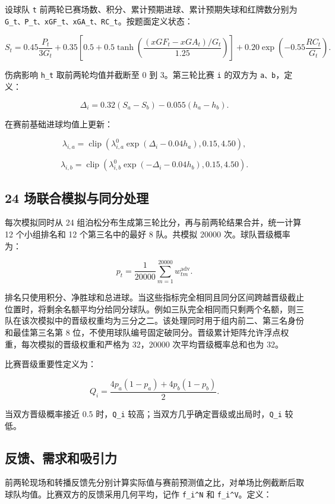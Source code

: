设球队 \texttt{t} 前两轮已赛场数、积分、累计预期进球、累计预期失球和红牌数分别为 \texttt{G\_t、P\_t、xGF\_t、xGA\_t、RC\_t}。按题面定义状态：

\[
S_t=0.45\frac{P_t}{3G_t}
+0.35\left[0.5+0.5\tanh\left(
\frac{(xGF_t-xGA_t)/G_t}{1.25}
\right)\right]
+0.20\exp\left(-0.55\frac{RC_t}{G_t}\right).
\]

伤病影响 \texttt{h\_t} 取前两轮均值并截断至 0 到 3。第三轮比赛 \texttt{i} 的双方为 \texttt{a、b}，定义：

\[
\Delta_i=0.32(S_a-S_b)-0.055(h_a-h_b).
\]

在赛前基础进球均值上更新：

\[
\lambda_{i,a}=\operatorname{clip}\left(
\lambda_{i,a}^0\exp(\Delta_i-0.04h_a),0.15,4.50
\right),
\]

\[
\lambda_{i,b}=\operatorname{clip}\left(
\lambda_{i,b}^0\exp(-\Delta_i-0.04h_b),0.15,4.50
\right).
\]

\subsection{24 场联合模拟与同分处理}

每次模拟同时从 24 组泊松分布生成第三轮比分\cite{maher1982}，再与前两轮结果合并，统一计算 12 个小组排名和 12 个第三名中的最好 8 队。共模拟 20000 次。球队晋级概率为：

\[
p_t=\frac{1}{20000}\sum_{m=1}^{20000}w_{tm}^{\mathrm{adv}}.
\]

排名只使用积分、净胜球和总进球。当这些指标完全相同且同分区间跨越晋级截止位置时，将剩余名额平均分给同分球队。例如三队完全相同而只剩两个名额，则三队在该次模拟中的晋级权重均为三分之二。该处理同时用于组内前二、第三名身份和最佳第三名第 8 位，不使用球队编号固定破同分。晋级累计矩阵允许浮点权重，每次模拟的晋级权重和严格为 32，20000 次平均晋级概率总和也为 32。

比赛晋级重要性定义为：

\[
Q_i=\frac{4p_a(1-p_a)+4p_b(1-p_b)}{2}.
\]

当双方晋级概率接近 0.5 时，\texttt{Q\_i} 较高；当双方几乎确定晋级或出局时，\texttt{Q\_i} 较低。

\subsection{反馈、需求和吸引力}

前两轮现场和转播反馈先分别计算实际值与赛前预测值之比，对单场比例截断后取球队均值。比赛双方的反馈采用几何平均，记作 \texttt{f\_i\^{}N} 和 \texttt{f\_i\^{}V}。定义：

